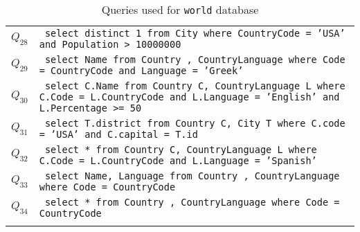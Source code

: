 \begin{table}
\begin{tabular}{l|L{12cm}}
		$Q_{28}$ & \texttt{
			select distinct 1 from City where CountryCode = 'USA' and Population > 10000000
		} \\ \hdashline
		
		$Q_{29}$ & \texttt{
			select Name from Country , CountryLanguage where Code = CountryCode and Language = 'Greek'
		} \\ \hdashline
		
		$Q_{30}$ & \texttt{
			select C.Name from Country C, CountryLanguage L where C.Code = L.CountryCode and L.Language = 'English' and L.Percentage >= 50
		} \\ \hdashline
		
		$Q_{31}$ & \texttt{
			select T.district from Country C, City T where C.code = 'USA' and C.capital = T.id
		} \\ \hdashline
		
		$Q_{32}$ & \texttt{
			select * from Country C, CountryLanguage L where C.Code = L.CountryCode and L.Language = 'Spanish'
		} \\ \hdashline
		
		$Q_{33}$ & \texttt{
			select Name, Language from Country , CountryLanguage where Code = CountryCode 
		} \\ \hdashline
		
		$Q_{34}$ & \texttt{
			select * from Country , CountryLanguage where Code = CountryCode
		} \\ \hdashline
		
	\end{tabular}
	\vspace{2mm}
	\caption{Queries used for \texttt{world} database}
	\label{table:worldqueries}
\end{table}



